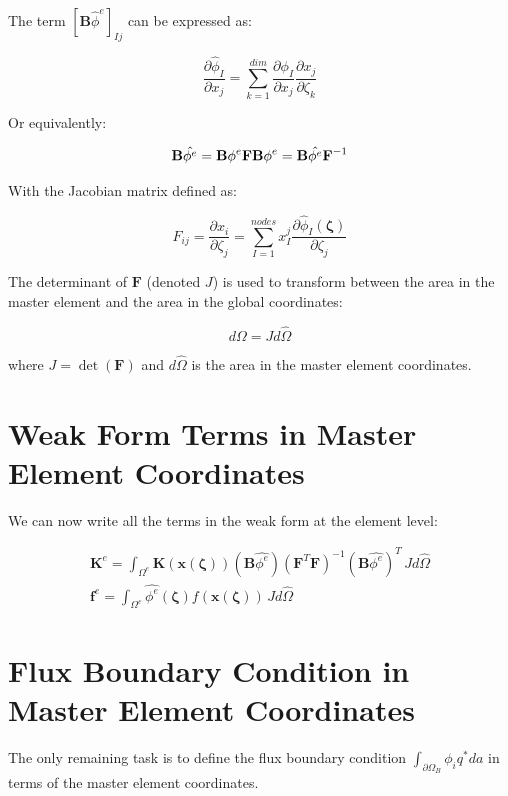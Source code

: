 \documentclass[
  11pt,
  a4paper,
]{scrbook}
\begin{document}
The term \([\mathbf{B}\hat{\phi}^e]_{Ij}\) can be expressed as:

\[\frac{\partial\hat{\phi}_I}{\partial x_j}=\sum_{k=1}^{dim}\frac{\partial{\phi}_I}{\partial x_j}\frac{\partial x_j}{\partial \zeta_k}\]

Or equivalently:

\[\mathbf{B}\hat{\phi^e}=\mathbf{B}\phi^e\mathbf{F} \\
\mathbf{B}{\phi}^e=\mathbf{B}{\hat{\phi^e}}\mathbf{F}^{-1}\]

With the Jacobian matrix defined as:

\[F_{ij}=\frac{\partial x_i}{\partial \zeta_j}=\sum_{I=1}^{nodes}x_I^j\frac{\partial\hat{\phi}_I(\mathbf{\zeta})}{\partial\zeta_j}\]

The determinant of \(\mathbf{F}\) (denoted \(J\)) is used to transform
between the area in the master element and the area in the global
coordinates:

\[d\Omega = J d\hat{\Omega}\]

where \(J = \det(\mathbf{F})\) and \(d\hat{\Omega}\) is the area in the
master element coordinates.

\section{Weak Form Terms in Master Element
Coordinates}\label{weak-form-terms-in-master-element-coordinates}

We can now write all the terms in the weak form at the element level:

\[\begin{aligned}
\mathbf{K}^e =\int_{\Omega^e} \mathbf{K}(\mathbf{x}(\mathbf{\zeta}))(\mathbf{B}\hat{\phi^e})(\mathbf{F}^T\mathbf{F})^{-1}  (\mathbf{B}\hat{\phi^e})^T \, Jd\hat{\Omega} \\
\mathbf{f}^e = \int_{\Omega^e} \hat{\phi^e}(\mathbf{\zeta})f(\mathbf{x}(\mathbf{\zeta})) \, Jd\hat{\Omega}
\end{aligned}\]

\section{Flux Boundary Condition in Master Element
Coordinates}\label{flux-boundary-condition-in-master-element-coordinates}

The only remaining task is to define the flux boundary condition
\(\int_{\partial\Omega_B}\phi_iq^*da\) in terms of the master element
coordinates.
\end{document}
